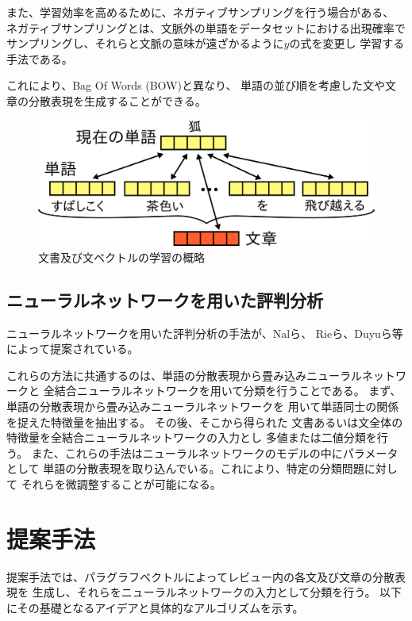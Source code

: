 \documentclass[twocolumn,a4paper]{ltjarticle}
\makeatletter
\let\tti@includegraphics\includegraphics
\renewcommand{\includegraphics}[1]{%
    \tti@includegraphics[width=\linewidth]{#1}}
\makeatother
\begin{document}
また、学習効率を高めるために、ネガティブサンプリングを行う場合がある、
ネガティブサンプリングとは、文脈外の単語をデータセットにおける出現確率で
サンプリングし、それらと文脈の意味が遠ざかるように$y$の式を変更し
学習する手法である。

これにより、Bag Of Words (BOW)と異なり、
単語の並び順を考慮した文や文章の分散表現を生成することができる。

\begin{figure}
  \includegraphics{fig/paragraph_vector.png}
  \caption{文書及び文ベクトルの学習の概略}
  \label{fig:ParagraphVector}
\end{figure}


\subsection{ニューラルネットワークを用いた評判分析}

ニューラルネットワークを用いた評判分析の手法が、Nalら\cite{nal14}、
Rieら\cite{rie14}、Duyuら\cite{duyu15}等によって提案されている。

これらの方法に共通するのは、単語の分散表現から畳み込みニューラルネットワークと
全結合ニューラルネットワークを用いて分類を行うことである。
まず、単語の分散表現から畳み込みニューラルネットワークを
用いて単語同士の関係を捉えた特徴量を抽出する。
その後、そこから得られた
文書あるいは文全体の特徴量を全結合ニューラルネットワークの入力とし
多値または二値分類を行う。
また、これらの手法はニューラルネットワークのモデルの中にパラメータとして
単語の分散表現を取り込んでいる。これにより、特定の分類問題に対して
それらを微調整することが可能になる。



\section{提案手法}

提案手法では、パラグラフベクトルによってレビュー内の各文及び文章の分散表現を
生成し、それらをニューラルネットワークの入力として分類を行う。
以下にその基礎となるアイデアと具体的なアルゴリズムを示す。
\end{document}
